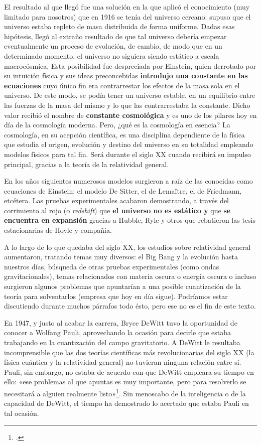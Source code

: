 \documentclass[11pt,a4paper,titlepage]{article}
\begin{document}
\par El resultado al que llegó fue una solución en la que aplicó el conocimiento (muy limitado para nosotros) que en 1916 se tenía del universo cercano: supuso que el universo estaba repleto de masa distribuida de forma uniforme. Dadas esas hipótesis, llegó al extraño resultado de que tal universo debería empezar eventualmente un proceso de evolución, de cambio, de modo que en un determinado momento, el universo no siguiera siendo estático a escala macrocósmica. Esta posibilidad fue despreciada por Einstein, quien derrotado por su intuición física y sus ideas preconcebidas \textbf{introdujo una constante en las ecuaciones} cuyo único fin era contrarrestar los efectos de la masa sola en el universo. De este modo, se podía tener un universo estable, en un equilibrio entre las fuerzas de la masa del mismo y lo que las contrarrestaba la constante. Dicho valor recibió el nombre de \textbf{constante cosmológica} y es uno de los pilares hoy en día de la cosmología moderna. Pero, ¿qué es la cosmología en esencia? La cosmología, en su acepción científica, es una disciplina dependiente de la física que estudia el origen, evolución y destino del universo en su totalidad empleando modelos físicos para tal fin. Será durante el siglo XX cuando recibirá su impulso principal, gracias a la teoría de la relatividad general.
\\\par En los años siguientes numerosos modelos surgieron a raíz de las conocidas como ecuaciones de Einstein: el modelo De Sitter, el de Lemaître, el de Friedmann, etcétera. Las pruebas experimentales acabaron demostrando, a través del corrimiento al rojo (o \textit{redshift}) que \textbf{el universo no es estático y} que \textbf{se encuentra en expansión} gracias a Hubble, Ryle y otros que rebatieron las tesis estacionarias de Hoyle y compañía.
\par A lo largo de lo que quedaba del siglo XX, los estudios sobre relatividad general aumentaron, tratando temas muy diversos: el Big Bang y la evolución hasta nuestros días, búsqueda de otras pruebas experimentales (como ondas gravitacionales), temas relacionados con materia oscura o energía oscura o incluso surgieron algunos problemas que apuntarían a una posible cuantización de la teoría para solventarlos (empresa que hoy en día sigue). Podríamos estar discutiendo durante muchos párrafos todo ésto, pero ese no es el fin de este texto.
\\\par En 1947, y justo al acabar la carrera, Bryce DeWitt tuvo la oportunidad de conocer a Wolfang Pauli, aprovechando la ocasión para decirle que estaba trabajando en la cuantización del campo gravitatorio. A DeWitt le resultaba incomprensible que las dos teorías científicas más revolucionarias del siglo XX (la física cuántica y la relatividad general) no tuvieran ninguna relación entre sí. Pauli, sin embargo, no estaba de acuerdo con que DeWitt empleara su tiempo en ello: «ese problemas al que apuntas es muy importante, pero para resolverlo se necesitará a alguien realmente listo»\footnote{\cite[p.~230]{teoriaperfecta}.}. Sin menoscabo de la inteligencia o de la capacidad de DeWitt, el tiempo ha demostrado lo acertado que estaba Pauli en tal ocasión.
\end{document}
